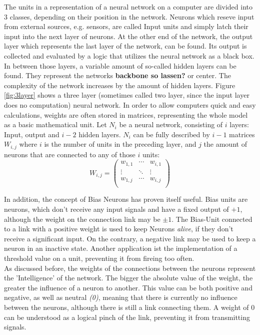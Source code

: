 \documentclass[10pt,a4paper,DIV=11]{scrreprt}
\begin{document}
The units in a representation of a neural network on a computer are divided into 3 classes, depending on their position in the network. Neurons which reseve input from external sources, e.g. sensors, are called Input units and simply latch  their input into the next layer of neurons. At the other end of the network, the output layer which represents the last layer of the network, can be found. Its output is collected and evaluated by a logic that utilizes the neural network as a black box. In between those layers, a variable amount of so-called hidden layers can be found. They represent the networks \textbf{backbone so lassen?} or center. The complexity of the network increases by the amount of hidden layers. Figure \ref{fig:3layer} shows a three layer (sometimes called two layer, since the input layer does no computation) neural network. 
In order to allow computers quick and easy calculations, weights are often stored in matrices, representing the whole model as a basic mathematical unit. Let $N_{i}$ be a neural network, consisting of $i$ layers: Input,  output and $i-2$ hidden layers. $N_{i}$ can be fully described by $i-1$ matrices $W_{i,j}$ where $i$ is the number of units in the preceding layer, and $j$ the amount of neurons that are connected to any of those $i$ units:
\begin{equation}
W_{i,j} = 
\begin{pmatrix}
w_{1,1} & \cdots & w_{i,1} \\
\vdots & \ddots & \vdots \\
w_{1,j} & \cdots & w_{i,j} \\
\end{pmatrix}
\end{equation}





In addition, the concept of Bias Neurons has proven itself useful. Bias units   are neurons, which don't receive any input signals and have a fixed output of $+ 1$, although the weight on the connection link may be $\pm 1$. The Bias-Unit connected to a link with a positive weight is used to keep Neurons \textit{alive}, if they don't receive a significant input. On the contrary, a negative link may be used to keep a neuron in an inactive state.
Another application ist the implementation of a threshold value on a unit, preventing it from fireing too often.\\ 

As discussed before, the weights of the connections between the neurons represent the 'Intelligence' of the network. The bigger the absolute value of the weight, the greater the influence of a neuron to another. This value can be both positive and negative, as well as neutral \textit{(0)}, meaning that there is currently no influence between the neurons, although there is still a link connecting them. A weight of 0 can be understood as a logical pinch of the link, preventing it from transmitting signals.
\end{document}
